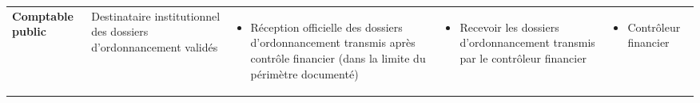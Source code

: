 \begin{landscape}
\begin{longtable}{L{2.8cm} L{3.6cm} L{5.8cm} L{6.2cm} L{3.8cm}}
\textbf{Comptable public} &
Destinataire institutionnel des dossiers d'ordonnancement validés &
\begin{itemize}[leftmargin=1em, nosep]
  \item Réception officielle des dossiers d'ordonnancement transmis après contrôle financier (dans la limite du périmètre documenté)
\end{itemize} &
\begin{itemize}[leftmargin=1em, nosep]
  \item Recevoir les dossiers d'ordonnancement transmis par le contrôleur financier
\end{itemize} &
\begin{itemize}[leftmargin=1em, nosep]
  \item Contrôleur financier
\end{itemize} \\
\end{longtable}
\end{landscape}
